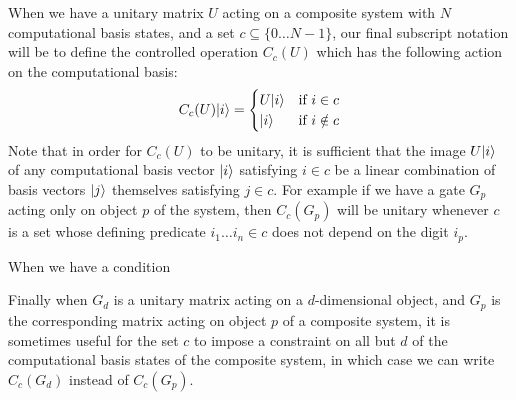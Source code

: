 When we have a unitary matrix $U$ acting on a composite system with $N$ computational basis states, and a set $c \subseteq \{0\dots N-1\}$, our final subscript notation will be to define the controlled operation $C_c(U)$ which has the following action on the computational basis:
\[C_c(U)| i \rangle = \begin{cases}
	U| i \rangle & \text{if\ }i \in c \\
	| i \rangle & \text{if\ }i \notin c
\end{cases}\]
Note that in order for $C_c(U)$ to be unitary, it is sufficient that the image $U| i \rangle$ of any computational basis vector $| i \rangle$ satisfying $i \in c$ be a linear combination of basis vectors $| j \rangle$ themselves satisfying $j \in c$. For example if we have a gate $G_p$ acting only on object $p$ of the system, then $C_c(G_p)$ will be unitary whenever $c$ is a set whose defining predicate $i_1\dots i_n \in c$ does not depend on the digit $i_p$.

When we have a condition 

Finally when $G_d$ is a unitary matrix acting on a $d$-dimensional object, and $G_p$ is the corresponding matrix acting on object $p$ of a composite system, it is sometimes useful for the set $c$ to impose a constraint on all but $d$ of the computational basis states of the composite system, in which case we can write $C_c(G_d)$ instead of $C_c(G_p)$.